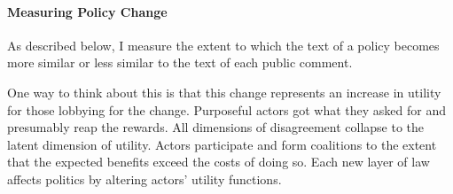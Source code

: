 




\paragraph{Measuring Policy Change}

As described below, I measure the extent to which the text of a policy becomes more similar or less similar to the text of each public comment. 

One way to think about this is that this change represents an increase in utility for those lobbying for the change. Purposeful actors got what they asked for and presumably reap the rewards. All dimensions of disagreement collapse to the latent dimension of utility. Actors participate and form coalitions to the extent that the expected benefits exceed the costs of doing so. Each new layer of law affects politics by altering actors' utility functions. 

